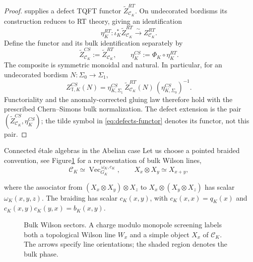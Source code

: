 \documentclass[12pt]{amsart}
\makeatletter
\renewcommand\subsection{\@startsection{subsection}{2}%
  \z@{.5\linespacing\@plus.7\linespacing}{-.5em}%
  {\normalfont\bfseries}}
\numberwithin{equation}{section}
\theoremstyle{definition}
\makeatother
\begin{document}
\begin{proof}
\cite[Theorem~5.8]{CRS2019}
supplies a defect TQFT functor $\widetilde Z^{RT}_{\mathcal C_K}$.
On undecorated bordisms its construction reduces to RT theory,
giving an identification
$$
\eta_K^{RT}:\iota_K^*\widetilde Z^{RT}_{\mathcal C_K}
\xrightarrow{\sim}Z^{RT}_{\mathcal C_K}.
$$
Define the functor and its bulk identification separately by
\begin{equation}
\label{eq:defects-transport}
\widetilde Z^{CS}_{\mathcal C_K}
:=\widetilde Z^{RT}_{\mathcal C_K},\qquad
\eta_K^{CS}:=\Phi_K\circ\eta_K^{RT}.
\end{equation}
The composite is symmetric monoidal and natural. In particular, for
an undecorated bordism $N:\Sigma_0\to\Sigma_1$,
$$
Z^{CS}_{\mathbb T,K}(N)=
\eta_{K,\Sigma_1}^{CS}\,
\widetilde Z^{RT}_{\mathcal C_K}(N)\,
(\eta_{K,\Sigma_0}^{CS})^{-1}.
$$
Functoriality and the anomaly-corrected gluing law therefore hold
with the prescribed Chern--Simons bulk normalization. The defect
extension is the pair
$(\widetilde Z^{CS}_{\mathcal C_K},\eta_K^{CS})$; the tilde symbol
in \eqref{eq:defects-functor} denotes its functor, not this pair.
\end{proof}


\subsection{Connected \'etale algebras in the Abelian case}
Let us choose  a pointed braided convention, see Figure\ref{fig:bulk-lines} for a representation of bulk Wilson lines, 
$$
\mathcal C_K\simeq\operatorname{Vec}^{\,\omega_K,c_K}_{G_K},
\qquad X_x\otimes X_y\simeq X_{x+y},
$$

where the associator from $(X_x\otimes X_y)\otimes X_z$ to
$X_x\otimes(X_y\otimes X_z)$ has scalar $\omega_K(x,y,z)$.
The braiding has scalar $c_K(x,y)$, with
$c_K(x,x)=q_K(x)$ and $c_K(x,y)c_K(y,x)=b_K(x,y)$.


\begin{figure}[htbp]
\centering
{}
\caption{Bulk Wilson sectors. A charge modulo monopole screening labels
both a topological Wilson line $W_x$ and a simple object $X_x$ of
$\mathcal C_K$. The arrows specify line orientations; the shaded region
denotes the bulk phase.}
\label{fig:bulk-lines}
\end{figure}
\end{document}
